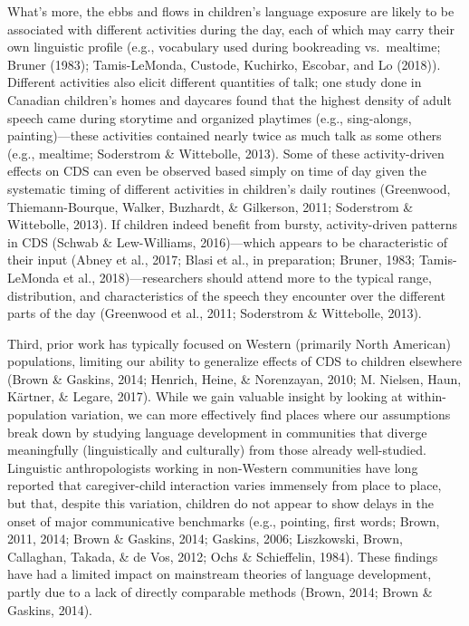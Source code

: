 \documentclass[floatsintext,man]{apa6}
\theoremstyle{definition}
\theoremstyle{definition}
\theoremstyle{definition}
\theoremstyle{remark}
\begin{document}
What's more, the ebbs and flows in children's language exposure are
likely to be associated with different activities during the day, each
of which may carry their own linguistic profile (e.g., vocabulary used
during bookreading vs.~mealtime; Bruner (1983); Tamis-LeMonda, Custode,
Kuchirko, Escobar, and Lo (2018)). Different activities also elicit
different quantities of talk; one study done in Canadian children's
homes and daycares found that the highest density of adult speech came
during storytime and organized playtimes (e.g., sing-alongs,
painting)---these activities contained nearly twice as much talk as some
others (e.g., mealtime; Soderstrom \& Wittebolle, 2013). Some of these
activity-driven effects on CDS can even be observed based simply on time
of day given the systematic timing of different activities in children's
daily routines (Greenwood, Thiemann-Bourque, Walker, Buzhardt, \&
Gilkerson, 2011; Soderstrom \& Wittebolle, 2013). If children indeed
benefit from bursty, activity-driven patterns in CDS (Schwab \&
Lew-Williams, 2016)---which appears to be characteristic of their input
(Abney et al., 2017; Blasi et al., in preparation; Bruner, 1983;
Tamis-LeMonda et al., 2018)---researchers should attend more to the
typical range, distribution, and characteristics of the speech they
encounter over the different parts of the day (Greenwood et al., 2011;
Soderstrom \& Wittebolle, 2013).

Third, prior work has typically focused on Western (primarily North
American) populations, limiting our ability to generalize effects of CDS
to children elsewhere (Brown \& Gaskins, 2014; Henrich, Heine, \&
Norenzayan, 2010; M. Nielsen, Haun, Kärtner, \& Legare, 2017). While we
gain valuable insight by looking at within-population variation, we can
more effectively find places where our assumptions break down by
studying language development in communities that diverge meaningfully
(linguistically and culturally) from those already well-studied.
Linguistic anthropologists working in non-Western communities have long
reported that caregiver-child interaction varies immensely from place to
place, but that, despite this variation, children do not appear to show
delays in the onset of major communicative benchmarks (e.g., pointing,
first words; Brown, 2011, 2014; Brown \& Gaskins, 2014; Gaskins, 2006;
Liszkowski, Brown, Callaghan, Takada, \& de Vos, 2012; Ochs \&
Schieffelin, 1984). These findings have had a limited impact on
mainstream theories of language development, partly due to a lack of
directly comparable methods (Brown, 2014; Brown \& Gaskins, 2014).
\end{document}
